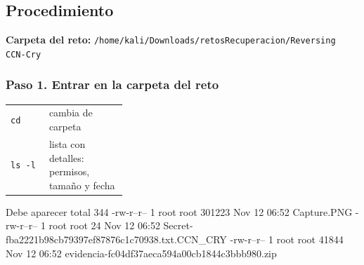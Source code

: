\documentclass[11pt,a4paper]{article}
\begin{document}
\subsection{Procedimiento}

\noindent\textbf{Carpeta del reto:} \texttt{/\allowbreak{}home/\allowbreak{}kali/\allowbreak{}Downloads/\allowbreak{}retosRecuperacion/\allowbreak{}Reversing CCN-Cry}


\subsubsection*{Paso 1. Entrar en la carpeta del reto}
\begin{tcolorbox}[enhanced, breakable, colback=gray!3, colframe=gray!35, boxrule=0.3pt, arc=1pt, left=4pt, right=4pt, top=2pt, bottom=2pt, fonttitle=\sffamily\scriptsize\bfseries, coltitle=black!70, colbacktitle=gray!10, title={Qué hace cada parte}, attach title to upper, before skip=2pt, after skip=4pt, fontupper=\small]
\par{\renewcommand{\arraystretch}{1.12}\begin{tabularx}{\linewidth}{@{}>{\raggedright\arraybackslash}p{0.33\linewidth}>{\raggedright\arraybackslash}X@{}}
\texttt{cd} & cambia de carpeta \\
\texttt{ls -l} & lista con detalles: permisos, tamaño y fecha \\
\end{tabularx}}
\end{tcolorbox}
\begin{salida}{Debe aparecer}
total 344
-rw-r--r-- 1 root root 301223 Nov 12 06:52 Capture.PNG
-rw-r--r-- 1 root root     24 Nov 12 06:52 Secret-fba2221b98cb79397ef87876c1c70938.txt.CCN_CRY
-rw-r--r-- 1 root root  41844 Nov 12 06:52 evidencia-fc04df37aeca594a00cb1844c3bbb980.zip
\end{salida}
\end{document}
